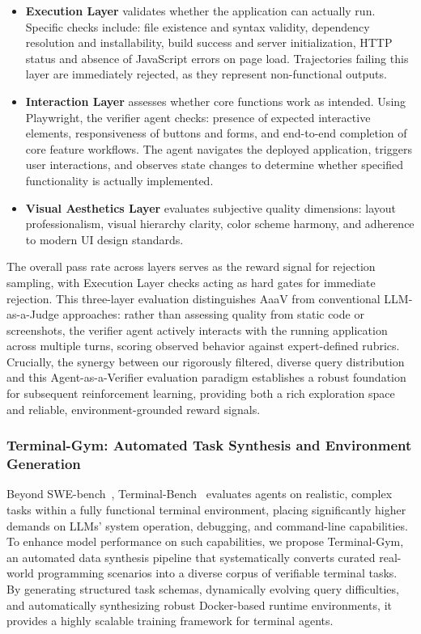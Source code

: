 \begin{itemize}
    \item \textbf{Execution Layer} validates whether the application can actually run. Specific checks include: file existence and syntax validity, dependency resolution and installability, build success and server initialization, HTTP status and absence of JavaScript errors on page load. Trajectories failing this layer are immediately rejected, as they represent non-functional outputs.
    \item \textbf{Interaction Layer} assesses whether core functions work as intended. Using Playwright, the verifier agent checks: presence of expected interactive elements, responsiveness of buttons and forms, and end-to-end completion of core feature workflows. The agent navigates the deployed application, triggers user interactions, and observes state changes to determine whether specified functionality is actually implemented.
    \item \textbf{Visual Aesthetics Layer} evaluates subjective quality dimensions: layout professionalism, visual hierarchy clarity, color scheme harmony, and adherence to modern UI design standards.
\end{itemize}

The overall pass rate across layers serves as the reward signal for rejection sampling, with Execution Layer checks acting as hard gates for immediate rejection. This three-layer evaluation distinguishes AaaV from conventional LLM-as-a-Judge approaches: rather than assessing quality from static code or screenshots, the verifier agent actively interacts with the running application across multiple turns, scoring observed behavior against expert-defined rubrics. Crucially, the synergy between our rigorously filtered, diverse query distribution and this Agent-as-a-Verifier evaluation paradigm establishes a robust foundation for subsequent reinforcement learning, providing both a rich exploration space and reliable, environment-grounded reward signals.

\subsubsection{Terminal-Gym: Automated Task Synthesis and Environment Generation}

Beyond SWE-bench~\citep{jimenez2024swebench}, Terminal-Bench~\cite{merrill2026terminalbench} evaluates agents on realistic, complex tasks within a fully functional terminal environment, placing significantly higher demands on LLMs' system operation, debugging, and command-line capabilities. To enhance model performance on such capabilities, we propose Terminal-Gym, an automated data synthesis pipeline that systematically converts curated real-world programming scenarios into a diverse corpus of verifiable terminal tasks. By generating structured task schemas, dynamically evolving query difficulties, and automatically synthesizing robust Docker-based runtime environments, it provides a highly scalable training framework for terminal agents.

